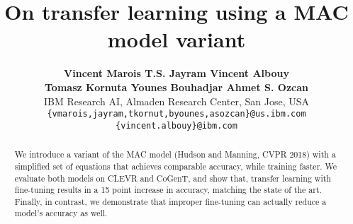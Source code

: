 \documentclass{article}
\title{On transfer learning using a MAC model variant}
\author{
	\textbf{\null\hfill Vincent Marois \hfill T.S. Jayram \hfill Vincent Albouy  \hfill\null}\\
	\textbf{\null\hfill Tomasz Kornuta \hfill Younes Bouhadjar \hfill Ahmet S. Ozcan \hfill\null}\\
	IBM Research AI, Almaden Research Center, San Jose, USA\\
	\texttt{\{vmarois,jayram,tkornut,byounes,asozcan\}@us.ibm.com}\\
	\texttt{\{vincent.albouy\}@ibm.com}\\
}
\begin{document}

\maketitle

\begin{abstract}
We introduce a variant of the MAC model (Hudson and Manning, CVPR 2018) with a simplified set of equations that achieves comparable accuracy, while training faster. We evaluate both models on CLEVR and CoGenT, and show that, transfer learning with fine-tuning results in a 15 point increase in accuracy, matching the state of the art. Finally, in contrast, we demonstrate that improper fine-tuning can actually reduce a model's accuracy as well.
\end{abstract}








\newpage



\newpage
\appendix

\end{document}
